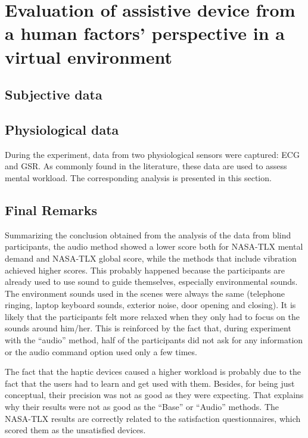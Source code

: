 \section{Evaluation of assistive device from a human factors’ perspective in a virtual environment}
\label{sec:results_obj_1}

\subsection{Subjective data}




\subsection{Physiological data}

During the experiment, data from two physiological sensors were captured: ECG and GSR. As commonly found in the literature, these data are used to assess mental workload. The corresponding analysis is presented in this section.




\subsection{Final Remarks}

Summarizing the conclusion obtained from the analysis of the data from blind participants, the audio method showed a lower score both for NASA-TLX mental demand and NASA-TLX global score, while the methods that include vibration achieved higher scores. This probably happened because the participants are already used to use sound to guide themselves, especially environmental sounds. The environment sounds used in the scenes were always the same (telephone ringing, laptop keyboard sounds, exterior noise, door opening and closing). It is likely that the participants felt more relaxed when they only had to focus on the sounds around him/her. This is reinforced by the fact that, during experiment with the “audio” method, half of the participants did not ask for any information or the audio command option used only a few times.

The fact that the haptic devices caused a higher workload is probably due to the fact that the users had to learn and get used with them. Besides, for being just conceptual, their precision was not as good as they were expecting. That explains why their results were not as good as the “Base” or “Audio” methods. The NASA-TLX results are correctly related to the satisfaction questionnaires, which scored them as the unsatisfied devices.


